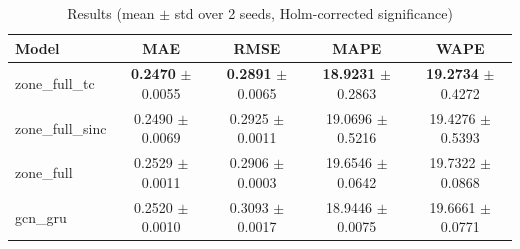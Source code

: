 \begin{table}[t]
\centering
\caption{Results (mean $\pm$ std over 2 seeds, Holm-corrected significance)}
\label{tab:results-chrono}
\begin{tabular}{lcccc}
\toprule
Model & MAE & RMSE & MAPE & WAPE \\
\midrule
zone_full_tc & \textbf{0.2470} $\pm$ 0.0055 & \textbf{0.2891} $\pm$ 0.0065 & \textbf{18.9231} $\pm$ 0.2863 & \textbf{19.2734} $\pm$ 0.4272 \\
zone_full_sinc & 0.2490 $\pm$ 0.0069 & 0.2925 $\pm$ 0.0011 & 19.0696 $\pm$ 0.5216 & 19.4276 $\pm$ 0.5393 \\
zone_full & 0.2529 $\pm$ 0.0011 & 0.2906 $\pm$ 0.0003 & 19.6546 $\pm$ 0.0642 & 19.7322 $\pm$ 0.0868 \\
gcn_gru & 0.2520 $\pm$ 0.0010 & 0.3093 $\pm$ 0.0017 & 18.9446 $\pm$ 0.0075 & 19.6661 $\pm$ 0.0771 \\
\bottomrule
\end{tabular}
\end{table}
